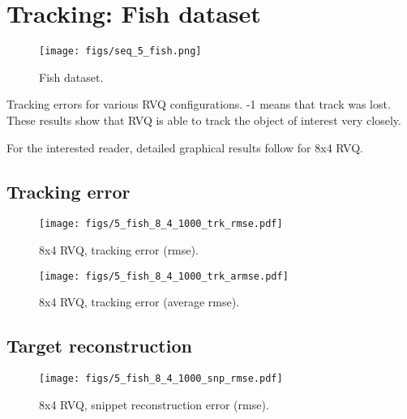\clearpage
\newpage
\section{Tracking: Fish dataset} 
								\begin{figure}[h!]
								\centering
								\texttt{[image: figs/seq\_5\_fish.png]}
								\caption{Fish dataset.}
								\label{fig:seq_5_fish}
								\end{figure}



\begin{table}[h]
\centering

\caption{Tracking errors for various RVQ configurations.  -1 means that track was lost.  These results show that RVQ is able to track the object of interest very closely.}
\end{table}

For the interested reader, detailed graphical results follow for 8x4 RVQ.
\clearpage
\newpage
\subsection{Tracking error}

								\begin{figure}[h!]
								\centering
								\texttt{[image: figs/5\_fish\_8\_4\_1000\_trk\_rmse.pdf]}
								\caption{8x4 RVQ, tracking error (rmse).}
								\label{fig:5_fish_8_4_1000_trk_rmse}
								\end{figure}


								\begin{figure}[h!]
								\centering
								\texttt{[image: figs/5\_fish\_8\_4\_1000\_trk\_armse.pdf]}
								\caption{8x4 RVQ, tracking error (average rmse).}
								\label{fig:5_fish_8_4_1000_trk_avg_rmse}
								\end{figure}

\clearpage
\newpage
\subsection{Target reconstruction}

								\begin{figure}[h!]
								\centering
								\texttt{[image: figs/5\_fish\_8\_4\_1000\_snp\_rmse.pdf]}
								\caption{8x4 RVQ, snippet reconstruction error (rmse).}
								\label{fig:5_fish_8_4_1000_snp_rmse}
								\end{figure}


